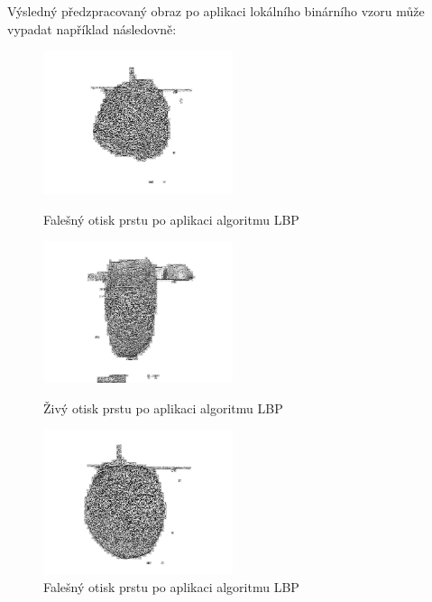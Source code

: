 Výsledný předzpracovaný obraz po aplikaci lokálního binárního vzoru může vypadat například následovně:
\begin{figure}[!htbp]
  \begin{minipage}[b]{0.3\linewidth}
    \centering
    \includegraphics[width=210px]{obrazky-figures/fake53otsulbp.png}
    \caption{Falešný otisk prstu po aplikaci algoritmu LBP}
  \end{minipage}
  \hspace{0.3cm}
  \begin{minipage}[b]{0.3\linewidth}
    \centering
    \includegraphics[width=210px]{obrazky-figures/Images29lbp.png}
    \caption{Živý otisk prstu po aplikaci algoritmu LBP}
  \end{minipage}
  \hspace{0.3cm}
    \begin{minipage}[b]{0.3\linewidth}
    \centering
    \includegraphics[width=210px]{obrazky-figures/fake44otsulbp.png}
    \caption{Falešný otisk prstu po aplikaci algoritmu LBP}
  \end{minipage}
\end{figure}

 
